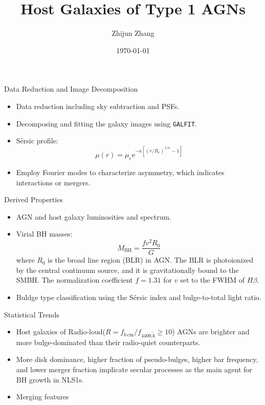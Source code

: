 \documentclass{beamer}
\title{Host Galaxies of Type 1 AGNs}
\author{Zhijun Zhang}
\date{\today}
\begin{document}
\begin{frame}[plain]
    \maketitle
\end{frame}

\begin{frame}{Data Reduction and Image Decomposition}
    \begin{itemize}
        \item Data reduction including sky subtraction and PSFs.
        
        \item Decomposing and fitting the galaxy images using \texttt{GALFIT}.
        
        \item S\'{e}rsic profile:
        \[
        \mu(r) = \mu_e\mathrm{e}^{-\kappa\left[(r/R_e)^{1/n}-1\right]}
        \]
        
        \item Employ Fourier modes to characterize asymmetry, which indicates interactions or mergers.
    \end{itemize}
\end{frame}

\begin{frame}{Derived Properties}
    \begin{itemize}
        \item AGN and host galaxy luminosities and spectrum.
        
        \item Virial BH masses:
        \[
        M_{\mathrm{BH}} = \frac{fv^2 R_0}{G}
        \]
        where $R_0$ is the broad line region (BLR) in AGN. The BLR is photoionized by the central continuum source, and it is gravitationally bound to the SMBH. The normalization coefficient $f=1.31$ for $v$ set to the FWHM of $H\beta$.
        
        \item Buldge type classification using the S\'{e}rsic index and bulge-to-total light ratio.
    \end{itemize}
\end{frame}

\begin{frame}{Statistical Trends}
    \begin{itemize}
        \item Host galaxies of Radio-loud($R=f_{6\,\mathrm{cm}}/f_{4400\mathring{A}}\geqslant10$) AGNs are brighter and more bulge-dominated than their radio-quiet counterparts.
        
        \item More disk dominance, higher fraction of pseudo-bulges, higher bar frequency, and lower merger fraction implicate secular processes as the main agent for BH growth in NLS1s.
        
        \item[?] Merging features
        
    \end{itemize}
\end{frame}
\end{document}
